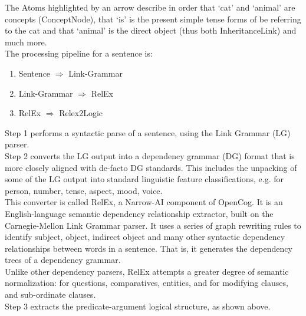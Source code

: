 The Atoms highlighted by an arrow describe in order that `cat' and `animal' are concepts (ConceptNode), that `is' is the present simple tense forms of be referring to the cat and that `animal' is the direct object (thus both InheritanceLink) and much more. \\

The processing pipeline for a sentence is: 
\begin{enumerate}
	\item Sentence $\Rightarrow$ Link-Grammar
	\item Link-Grammar $\Rightarrow$ RelEx
	\item RelEx $\Rightarrow$ Relex2Logic
\end{enumerate}

Step 1 performs a syntactic parse of a sentence, using the Link Grammar (LG) parser. \\

Step 2 converts the LG output into a dependency grammar (DG) format that is more closely aligned with de-facto DG standards. This includes the unpacking of some of the LG output into standard linguistic feature classifications, e.g. for person, number, tense, aspect, mood, voice. \\
This converter is called RelEx, a Narrow-AI component of OpenCog. It is an English-language semantic dependency relationship extractor, built on the Carnegie-Mellon Link Grammar parser. It uses a series of graph rewriting rules to identify subject, object, indirect object and many other syntactic dependency relationships between words in a sentence. That is, it generates the dependency trees of a dependency grammar. \\
Unlike other dependency parsers, RelEx attempts a greater degree of semantic normalization: for questions, comparatives, entities, and for modifying clauses, and sub-ordinate clauses. \\

Step 3 extracts the predicate-argument logical structure, as shown above.
